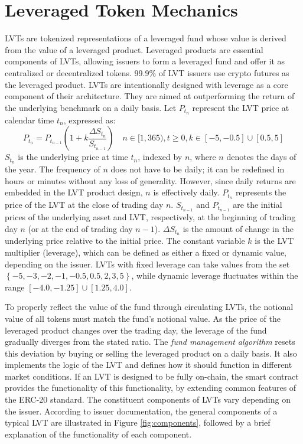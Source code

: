 \section{Leveraged Token Mechanics}\label{sec:mechanics}
LVTs are tokenized representations of a leveraged fund whose value is derived from the value of a leveraged product. Leveraged products are essential components of LVTs, allowing issuers to form a leveraged fund and offer it as centralized or decentralized tokens. 99.9\% of LVT issuers use crypto futures as the leveraged product. LVTs are intentionally designed with leverage as a core component of their architecture. They are aimed at outperforming the return of the underlying benchmark on a daily basis. Let $P_{t_{n}}$ represent the LVT price at calendar time $t_{n}$, expressed as:
\begin{equation}\label{eq:price}
	P_{t_{n}}=P_{t_{n-1}}\left(1+k\frac{\Delta S_{t_{n}}}{S_{t_{n-1}}}\right) \quad n\in[1,365), t\ge0, k\in\left[-5,-0.5\right] \cup \left[0.5,5\right]
\end{equation}
$S_{t_{n}}$ is the underlying price at time $t_{n}$, indexed by $n$, where $n$ denotes the days of the year. The frequency of $n$ does not have to be daily; it can be redefined in hours or minutes without any loss of generality. However, since daily returns are embedded in the LVT product design, $n$ is effectively daily. $P_{t_{n}}$ represents the price of the LVT at the close of trading day $n$. $S_{t_{n-1}}$ and $P_{t_{n-1}}$ are the initial prices of the underlying asset and LVT, respectively, at the beginning of trading day $n$ (or at the end of trading day $n-1$). $\Delta S_{t_{n}}$ is the amount of change in the underlying price relative to the initial price. The constant variable $k$ is the LVT multiplier (leverage), which can be defined as either a fixed or dynamic value, depending on the issuer. LVTs with fixed leverage can take values from the set $\left\{-5,-3,-2,-1,-0.5,0.5,2,3,5\right\}$, while dynamic leverage fluctuates within the range $\left[-4.0, -1.25 \right] \cup \left[ 1.25, 4.0 \right]$.

To properly reflect the value of the fund through circulating LVTs, the notional value of all tokens must match the fund's notional value. As the price of the leveraged product changes over the trading day, the leverage of the fund gradually diverges from the stated ratio. The \textsl{fund management algorithm} resets this deviation by buying or selling the leveraged product on a daily basis. It also implements the logic of the LVT and defines how it should function in different market conditions. If an LVT is designed to be fully on-chain, the smart contract provides the functionality of this functionality, by extending common features of the ERC-20 standard. The constituent components of LVTs vary depending on the issuer. According to issuer documentation, the general components of a typical LVT are illustrated in Figure \ref{fig:components}, followed by a brief explanation of the functionality of each component.


